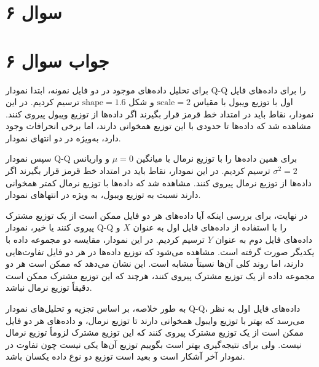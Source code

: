 \section*{سوال ۶}



\section*{جواب سوال ۶}

برای تحلیل داده‌های موجود در دو فایل نمونه، ابتدا نمودار Q-Q را برای داده‌های فایل اول با توزیع ویبول با مقیاس \( \text{scale} = 2 \) و شکل \( \text{shape} = 1.6 \) ترسیم کردیم. در این نمودار، نقاط باید در امتداد خط قرمز قرار بگیرند اگر داده‌ها از توزیع ویبول پیروی کنند. مشاهده شد که داده‌ها تا حدودی با این توزیع همخوانی دارند، اما برخی انحرافات وجود دارد، به‌ویژه در دو انتهای نمودار.

سپس نمودار Q-Q برای همین داده‌ها را با توزیع نرمال با میانگین \( \mu = 0 \) و واریانس \( \sigma^2 = 2 \) ترسیم کردیم. در این نمودار، نقاط باید در امتداد خط قرمز قرار بگیرند اگر داده‌ها از توزیع نرمال پیروی کنند. مشاهده شد که داده‌ها با توزیع نرمال کمتر همخوانی دارند نسبت به توزیع ویبول، به ویژه در انتهاهای نمودار.

در نهایت، برای بررسی اینکه آیا داده‌های هر دو فایل ممکن است از یک توزیع مشترک پیروی کنند یا خیر، نمودار Q-Q را با استفاده از داده‌های فایل اول به عنوان \( X \) و داده‌های فایل دوم به عنوان \( Y \) ترسیم کردیم. در این نمودار، مقایسه دو مجموعه داده با یکدیگر صورت گرفته است. مشاهده می‌شود که توزیع داده‌ها در هر دو فایل تفاوت‌هایی دارند، اما روند کلی آن‌ها نسبتاً مشابه است. این نشان می‌دهد که ممکن است هر دو مجموعه داده از یک توزیع مشترک پیروی کنند، هرچند که این توزیع مشترک ممکن است دقیقاً توزیع نرمال نباشد.

به طور خلاصه، بر اساس تجزیه و تحلیل‌های نمودار Q-Q، داده‌های فایل اول به نظر می‌رسد که بهتر با توزیع وایبول همخوانی دارند تا توزیع نرمال، و داده‌های هر دو فایل ممکن است از یک توزیع مشترک پیروی کنند که این توزیع مشترک لزوماً توزیع نرمال نیست. ولی برای نتیجه‌گیری بهتر است بگوییم توزیع آن‌ها یکی نیست چون تفاوت در نمودار آخر آشکار است و بعید است توزیع دو نوع داده یکسان باشد.